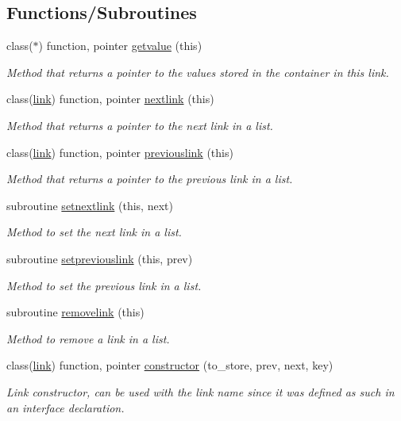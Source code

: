 \subsection*{Functions/\+Subroutines}
\begin{DoxyCompactItemize}
\item 
class($\ast$) function, pointer \mbox{\hyperlink{namespacelink__mod_aa2c8d19ee91797e19464fc7589cc2c39}{getvalue}} (this)
\begin{DoxyCompactList}\small\item\em Method that returns a pointer to the values stored in the container in this link. \end{DoxyCompactList}\item 
class(\mbox{\hyperlink{structlink__mod_1_1link}{link}}) function, pointer \mbox{\hyperlink{namespacelink__mod_a2d776121ed0138aba8b3d166938c964f}{nextlink}} (this)
\begin{DoxyCompactList}\small\item\em Method that returns a pointer to the next link in a list. \end{DoxyCompactList}\item 
class(\mbox{\hyperlink{structlink__mod_1_1link}{link}}) function, pointer \mbox{\hyperlink{namespacelink__mod_a2d23022ef22049f8340099b6960d8d5d}{previouslink}} (this)
\begin{DoxyCompactList}\small\item\em Method that returns a pointer to the previous link in a list. \end{DoxyCompactList}\item 
subroutine \mbox{\hyperlink{namespacelink__mod_a0dd2fe581e8d566faf03fc7ebd2f8524}{setnextlink}} (this, next)
\begin{DoxyCompactList}\small\item\em Method to set the next link in a list. \end{DoxyCompactList}\item 
subroutine \mbox{\hyperlink{namespacelink__mod_ad0d413cb7907fdcf6561639cdd03481a}{setpreviouslink}} (this, prev)
\begin{DoxyCompactList}\small\item\em Method to set the previous link in a list. \end{DoxyCompactList}\item 
subroutine \mbox{\hyperlink{namespacelink__mod_ae2d89f23eb8cf4b8065b8a39e9902a22}{removelink}} (this)
\begin{DoxyCompactList}\small\item\em Method to remove a link in a list. \end{DoxyCompactList}\item 
class(\mbox{\hyperlink{structlink__mod_1_1link}{link}}) function, pointer \mbox{\hyperlink{namespacelink__mod_ac5b4f1702d8edb10a4559f6f371dc797}{constructor}} (to\+\_\+store, prev, next, key)
\begin{DoxyCompactList}\small\item\em Link constructor, can be used with the \textquotesingle{}link\textquotesingle{} name since it was defined as such in an interface declaration. \end{DoxyCompactList}\end{DoxyCompactItemize}


